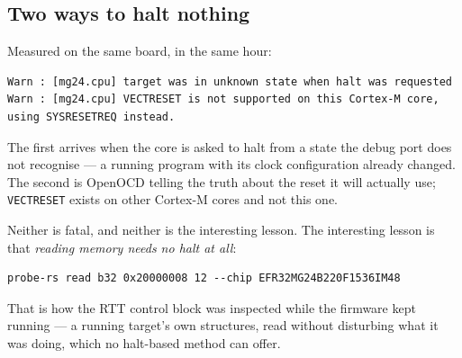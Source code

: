 \subsection{Two ways to halt nothing}

Measured on the same board, in the same hour:

\begin{verbatim}
Warn : [mg24.cpu] target was in unknown state when halt was requested
Warn : [mg24.cpu] VECTRESET is not supported on this Cortex-M core, using SYSRESETREQ instead.
\end{verbatim}

The first arrives when the core is asked to halt from a state the debug port does not recognise --- a running program with
its clock configuration already changed. The second is OpenOCD telling the truth about the reset it will actually use;
\texttt{VECTRESET} exists on other Cortex-M cores and not this one.

Neither is fatal, and neither is the interesting lesson. The interesting lesson is that \emph{reading memory needs no halt
at all}:

\begin{verbatim}
probe-rs read b32 0x20000008 12 --chip EFR32MG24B220F1536IM48
\end{verbatim}

That is how the RTT control block was inspected while the firmware kept running --- a running target's own structures, read
without disturbing what it was doing, which no halt-based method can offer.
